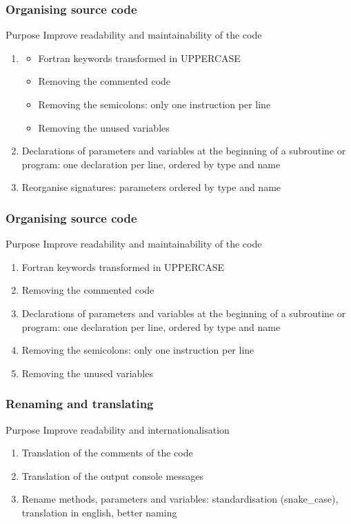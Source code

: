 \documentclass[10p]{beamer}
\begin{document}
\begin{frame}
\frametitle{Organising source code}
\begin{block}{Purpose}
Improve readability and maintainability of the code
\end{block}
\begin{enumerate}
\item \begin{itemize}
\item Fortran keywords transformed in UPPERCASE
\item Removing the commented code
\item Removing the semicolons: only one instruction per line
\item Removing the unused variables
\end{itemize}
\item Declarations of parameters and variables at the beginning of a subroutine or program: one declaration per line, ordered by type and name
\item Reorganise signatures: parameters ordered by type and name
\end{enumerate}
\end{frame}

\begin{frame}
\frametitle{Organising source code}
\begin{block}{Purpose}
Improve readability and maintainability of the code
\end{block}
\begin{enumerate}
\item Fortran keywords transformed in UPPERCASE
\item Removing the commented code
\item Declarations of parameters and variables at the beginning of a subroutine or program: one declaration per line, ordered by type and name
\item Removing the semicolons: only one instruction per line
\item Removing the unused variables
\end{enumerate}
\end{frame}

\begin{frame}
\frametitle{Renaming and translating}
\begin{block}{Purpose}
Improve readability and internationalisation
\end{block}
\begin{enumerate}
\item Translation of the comments of the code
\item Translation of the output console messages
\item Rename methods, parameters and variables: standardisation (snake\_case), translation in english, better naming
\end{enumerate}
\end{frame}
\end{document}
